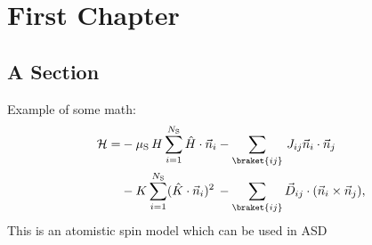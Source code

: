\chapter{First Chapter}
\label{Chapter:1}

\section{A Section}
\label{Section:1-1}

Example of some math:
\begin{equation}
	\begin{alignedat}{2}
	\mathcal{H} = &-\mu_\mathrm{S}\, H \sum\limits_{i=1}^{N_\mathrm{S}} \hat{H}\cdot\vec{n}_i &&- \sum\limits_{\braket{ij}}\, J_{ij} \vec{n}_i\cdot\vec{n}_j\\
	&-K \sum\limits_{i=1}^{N_\mathrm{S}} (\hat{K}\cdot\vec{n}_i)^2 &&- \sum\limits_{\braket{ij}} \vec{D}_{ij} \cdot (\vec{n}_i\times\vec{n}_j),
	\label{Eq:Hamiltonian_Model}
	\end{alignedat}
\end{equation}
This is an atomistic spin model which can be used in \acf{ASD}